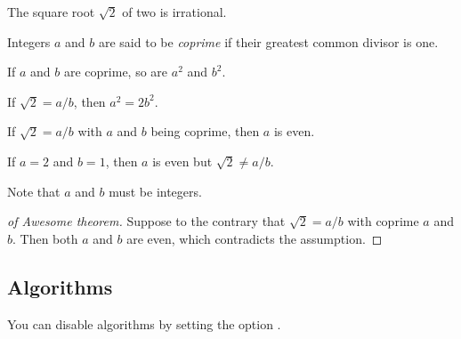 \documentclass[11pt, a4paper]{article}
\begin{document}
\begin{cnltxexample}
  \begin{theorem}
    The square root $\sqrt{2}$ of two is irrational.
  \end{theorem}

  \begin{definition}[Coprime]
    Integers $a$ and $b$ are said to be \emph{coprime} if their greatest common divisor is one.
  \end{definition}

  \begin{lemma}
    If $a$ and $b$ are coprime, so are $a^2$ and $b^2$.
  \end{lemma}

  \begin{proposition}
    If $\sqrt{2} = a/b$, then $a^2 = 2b^2$.
  \end{proposition}

  \begin{corollary}
    If $\sqrt{2} = a/b$ with $a$ and $b$ being coprime, then $a$ is even.
  \end{corollary}

  \begin{example}
    If $a = 2$ and $b = 1$, then $a$ is even but $\sqrt{2} \ne a/b$.
  \end{example}

  \begin{remark}
    Note that $a$ and $b$ must be integers.
  \end{remark}

  \begin{proof}[of Awesome theorem]
    Suppose to the contrary that $\sqrt{2} = a/b$ with coprime $a$ and $b$.
    Then both $a$ and $b$ are even, which contradicts the assumption.
  \end{proof}
\end{cnltxexample}

\subsection{Algorithms}

You can disable algorithms by setting the option .

\begin{cnltxexample}
  \begin{algorithmic}[1]
    \EndFor
  \end{algorithmic}
\end{cnltxexample}
\end{document}
